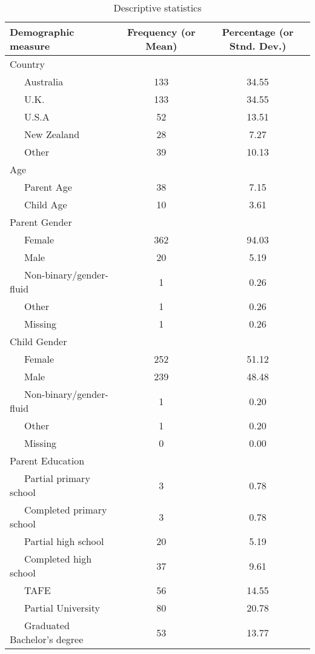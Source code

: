 \documentclass[
  english,
  man]{apa6}
\begin{document}
\begin{table}[tbp]

\begin{center}
\begin{threeparttable}

\caption{\label{tab:desctable}Descriptive statistics}

\small{

\begin{tabular}{lcc}
\toprule
Demographic measure & Frequency (or Mean) & Percentage (or Stnd. Dev.)\\
\midrule
Country &  & \\
\ \ \ Australia & 133 & 34.55\\
\ \ \ U.K. & 133 & 34.55\\
\ \ \ U.S.A & 52 & 13.51\\
\ \ \ New Zealand & 28 & 7.27\\
\ \ \ Other & 39 & 10.13\\
Age &  & \\
\ \ \ Parent Age & 38 & 7.15\\
\ \ \ Child Age & 10 & 3.61\\
Parent Gender &  & \\
\ \ \ Female & 362 & 94.03\\
\ \ \ Male & 20 & 5.19\\
\ \ \ Non-binary/gender-fluid & 1 & 0.26\\
\ \ \ Other & 1 & 0.26\\
\ \ \ Missing & 1 & 0.26\\
Child Gender &  & \\
\ \ \ Female & 252 & 51.12\\
\ \ \ Male & 239 & 48.48\\
\ \ \ Non-binary/gender-fluid & 1 & 0.20\\
\ \ \ Other & 1 & 0.20\\
\ \ \ Missing & 0 & 0.00\\
Parent Education &  & \\
\ \ \ Partial primary school & 3 & 0.78\\
\ \ \ Completed primary school & 3 & 0.78\\
\ \ \ Partial high school & 20 & 5.19\\
\ \ \ Completed high school & 37 & 9.61\\
\ \ \ TAFE & 56 & 14.55\\
\ \ \ Partial University & 80 & 20.78\\
\ \ \ Graduated Bachelor's degree & 53 & 13.77\\

\end{tabular}}
\end{threeparttable}
\end{center}
\end{table}
\end{document}
